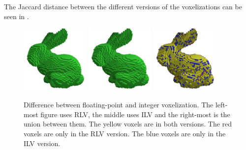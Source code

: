 The Jaccard distance between the different versions of the voxelizations can be seen in . 

\begin{figure}[h]
\centering
\includegraphics[width=0.3\textwidth]{fig/voxelization/bunny/bunny_rlv_64.png}
\includegraphics[width=0.3\textwidth]{fig/voxelization/bunny/bunny_ilv_64}
\includegraphics[width=0.3\textwidth]{fig/voxelization/bunny/bunny_rlv_ilv_64}
\caption{
  Difference between floating-point and integer voxelization.
  The left-most figure uses RLV, the middle uses ILV and the right-most is the union between them.
  The yellow voxels are in both versions.
  The red voxels are only in the RLV version.
  The blue voxels are only in the ILV version.
}\label{fig:compare}
\end{figure}

